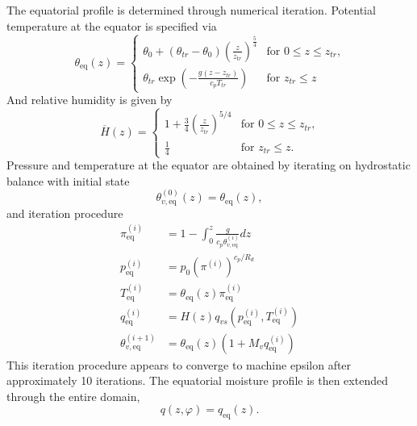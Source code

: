 \documentclass[times,doublespace]{fldauth}
\begin{document}
{The equatorial profile is determined through numerical iteration.  Potential temperature at the equator is specified via
\begin{equation}
\theta_{\text{eq}}(z) = \left\{ \begin{array}{ll} \displaystyle \theta_0 + (\theta_{tr} - \theta_0)\left(\frac{z}{z_{tr}}\right)^{\frac{5}{4}}  & \mbox{for $0 \leq z \leq z_{tr}$,} \\[2.0ex]
\displaystyle \theta_{tr} \exp\left(-\frac{g(z-z_{tr})}{c_pT_{tr}}\right) & \mbox{for $z_{tr} \leq z$} \end{array} \right.
\end{equation}  And relative humidity is given by
\begin{equation}
\overline{H}(z) = \left\{ \begin{array}{ll} \displaystyle 1 + \frac{3}{4}\left(\frac{z}{z_{tr}}\right)^{5/4} & \mbox{for $0 \leq z \leq z_{tr}$,} \\[2.0ex]
\displaystyle \frac{1}{4} & \mbox{for $z_{tr} \leq z$.} \end{array} \right.
\end{equation}  Pressure and temperature at the equator are obtained by iterating on hydrostatic balance  with initial state
\begin{equation}
\theta_{v,\text{eq}}^{(0)}(z) = \theta_{\text{eq}}(z),
\end{equation} and iteration procedure
\begin{align}
\pi_{\text{eq}}^{(i)} &= 1 - \int_{0}^{z} \frac{g}{c_p \theta_{v,\text{eq}}^{(i)}} dz \\
p_{\text{eq}}^{(i)} &= p_0 (\pi^{(i)})^{c_p / R_d} \\
T_{\text{eq}}^{(i)} &= \theta_{\text{eq}}(z) \pi_{\text{eq}}^{(i)} \\
q^{(i)}_{\text{eq}} &= H(z) q_{vs}(p_{\text{eq}}^{(i)}, T_{\text{eq}}^{(i)}) \\
\theta_{v,\text{eq}}^{(i+1)} &= \theta_{\text{eq}}(z) (1 + M_v q^{(i)}_{\text{eq}})
\end{align}  This iteration procedure appears to converge to machine epsilon after approximately 10 iterations.  The equatorial moisture profile is then extended through the entire domain,
\begin{equation}
q(z, \varphi) = q_{\text{eq}}(z).
\end{equation}

}
\end{document}

